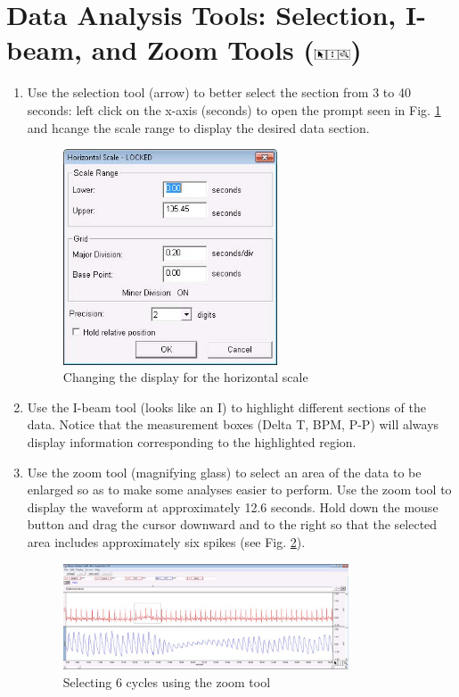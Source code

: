 \documentclass{article}
\begin{document}
\section*{Data Analysis Tools: Selection, I-beam, and Zoom Tools (\includegraphics[width=0.08\textwidth]{../images/BIOPAC_selection.jpg})}
\begin{enumerate}
	\item Use the selection tool (arrow) to better select the section from 3 to 40 seconds: left click on the x-axis (seconds) to open the prompt seen in Fig. \ref{change_horiz} and hcange the scale range to display the desired data section.
	
		\begin{figure}[h]
		\includegraphics[width=0.6\textwidth]{../images/BIOPAC_8.jpg}
		\centering
		\caption{Changing the display for the horizontal scale}
		\label{change_horiz}
		\end{figure}
		
	\item Use the I-beam tool (looks like an I) to highlight different sections of the data. Notice that the measurement boxes (Delta T, BPM, P-P) will always display information corresponding to the highlighted region.
	\item Use the zoom tool (magnifying glass) to select an area of the data to be enlarged so as to make some analyses easier to perform. Use the zoom tool to display the waveform at approximately 12.6 seconds. Hold down the mouse button and drag the cursor downward and to the right so that the selected area includes approximately six spikes (see Fig. \ref{select_cycles}).
	
		\begin{figure}[h]
		\includegraphics[width=0.8\textwidth]{../images/BIOPAC_9.jpg}
		\centering
		\caption{Selecting 6 cycles using the zoom tool}
		\label{select_cycles}
		\end{figure}
		

\end{enumerate}
\end{document}

